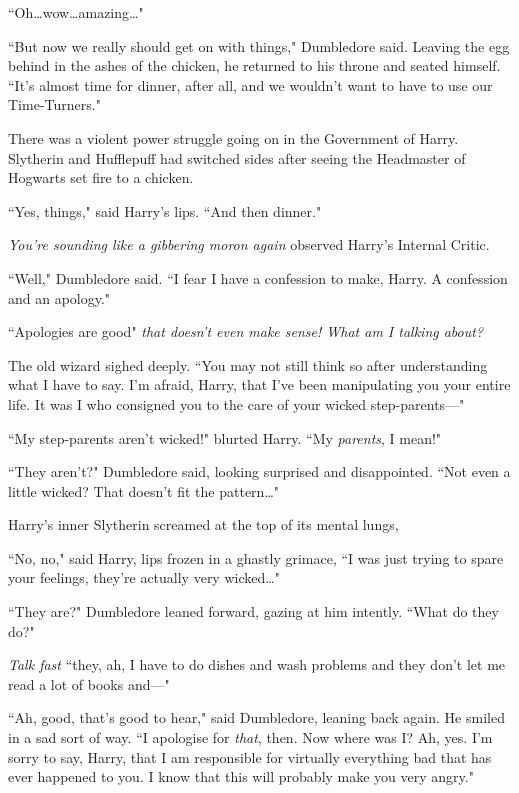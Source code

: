 ``Oh…wow…amazing…"

``But now we really should get on with things," Dumbledore said. Leaving the egg behind in the ashes of the chicken, he returned to his throne and seated himself. ``It's almost time for dinner, after all, and we wouldn't want to have to use our Time-Turners."

There was a violent power struggle going on in the Government of Harry. Slytherin and Hufflepuff had switched sides after seeing the Headmaster of Hogwarts set fire to a chicken.

``Yes, things," said Harry's lips. ``And then dinner."

\emph{You're sounding like a gibbering moron again} observed Harry's Internal Critic.

``Well," Dumbledore said. ``I fear I have a confession to make, Harry. A confession and an apology."

``Apologies are good" \emph{that doesn't even make sense! What am I talking about?}

The old wizard sighed deeply. ``You may not still think so after understanding what I have to say. I'm afraid, Harry, that I've been manipulating you your entire life. It was I who consigned you to the care of your wicked step-parents—"

``My step-parents aren't wicked!" blurted Harry. ``My \emph{parents}, I mean!"

``They aren't?" Dumbledore said, looking surprised and disappointed. ``Not even a little wicked? That doesn't fit the pattern…"

Harry's inner Slytherin screamed at the top of its mental lungs, \emph{}

``No, no," said Harry, lips frozen in a ghastly grimace, ``I was just trying to spare your feelings, they're actually very wicked…"

``They are?" Dumbledore leaned forward, gazing at him intently. ``What do they do?"

\emph{Talk fast} ``they, ah, I have to do dishes and wash problems and they don't let me read a lot of books and—"

``Ah, good, that's good to hear," said Dumbledore, leaning back again. He smiled in a sad sort of way. ``I apologise for \emph{that}, then. Now where was I? Ah, yes. I'm sorry to say, Harry, that I am responsible for virtually everything bad that has ever happened to you. I know that this will probably make you very angry."

